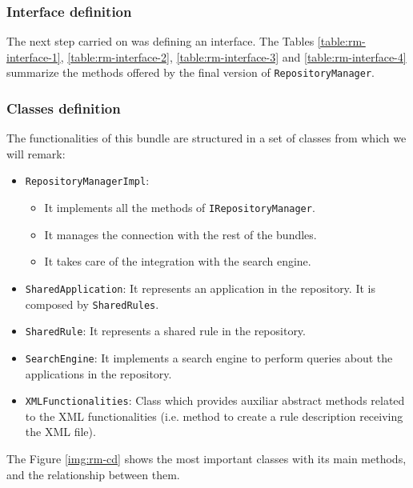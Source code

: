\subsubsection{Interface definition}

The next step carried on was defining an interface. The Tables
\ref{table:rm-interface-1}, \ref{table:rm-interface-2},
\ref{table:rm-interface-3} and \ref{table:rm-interface-4} summarize the
methods offered by the final version of \verb|RepositoryManager|.



\clearpage


\subsubsection{Classes definition}
\label{subsec:rm-classes-definition}

The functionalities of this bundle are structured in a set of classes from
which we will remark:

\begin{itemize}
  \item \verb|RepositoryManagerImpl|:
	\begin{itemize}
      \item It implements all the methods of \verb|IRepositoryManager|. 
      \item It manages the connection with the rest of the bundles.
      \item It takes care of the integration with the search engine. 
    \end{itemize}
  \item \verb|SharedApplication|: It represents an application in the
  repository. It is composed by \verb|SharedRules|.
  \item \verb|SharedRule|: It represents a shared rule in the repository.
  \item \verb|SearchEngine|: It implements a search engine to perform queries
  about the applications in the repository.
   \item \verb|XMLFunctionalities|: Class which provides auxiliar abstract
   methods related to the XML functionalities (i.e. method to create a rule
   description receiving the XML file).
\end{itemize}

The Figure \ref{img:rm-cd} shows the most important classes with its main
methods, and the relationship between them. \newline


